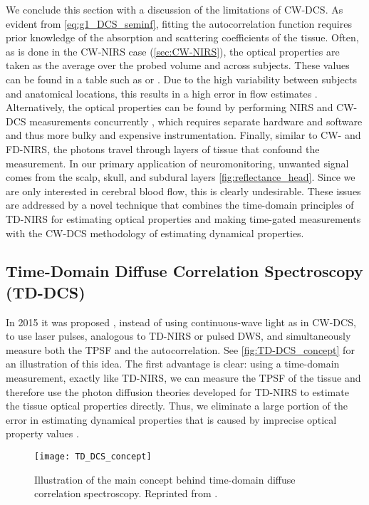 We conclude this section with a discussion of the limitations of CW-DCS. As evident from \autoref{eq:g1_DCS_seminf}, fitting the autocorrelation function requires prior knowledge of the absorption and scattering coefficients of the tissue. Often, as is done in the CW-NIRS case (\autoref{sec:CW-NIRS}), the optical properties are taken as the average over the probed volume and across subjects. These values can be found in a table such as \cite[ch. 5]{Handbook} or \cite[ch. 1]{Madsen2013}. Due to the high variability between subjects and anatomical locations, this results in a high error in flow estimates \cite{Irwin2011}. Alternatively, the optical properties can be found by performing NIRS and CW-DCS measurements concurrently \cite{Cheung2001, Lin2013}, which requires separate hardware and software and thus more bulky and expensive instrumentation. Finally, similar to CW- and FD-NIRS, the photons travel through layers of tissue that confound the measurement. In our primary application of neuromonitoring, unwanted signal comes from the scalp, skull, and subdural layers \autoref{fig:reflectance_head}. Since we are only interested in cerebral blood flow, this is clearly undesirable. These issues are addressed by a novel technique that combines the time-domain principles of TD-NIRS for estimating optical properties and making time-gated measurements with the CW-DCS methodology of estimating dynamical properties.


\subsection{Time-Domain Diffuse Correlation Spectroscopy (TD-DCS)} \label{sec:TD-DCS}
In 2015 it was proposed \cite{TDDCSpatent}, instead of using continuous-wave light as in CW-DCS, to use laser pulses, analogous to TD-NIRS or pulsed DWS, and simultaneously measure both the TPSF and the autocorrelation. See \autoref{fig:TD-DCS_concept} for an illustration of this idea. The first advantage is clear: using a time-domain measurement, exactly like TD-NIRS, we can measure the TPSF of the tissue and therefore use the photon diffusion theories developed for TD-NIRS to estimate the tissue optical properties directly. Thus, we eliminate a large portion of the error in estimating dynamical properties that is caused by imprecise optical property values \cite{Sutin2016}.

\begin{figure}[tb]
    \centering
    \texttt{[image: TD\_DCS\_concept]}
    \caption{Illustration of the main concept behind time-domain diffuse correlation spectroscopy. Reprinted from \cite{Sutin2016}.}
    \label{fig:TD-DCS_concept}
\end{figure}

